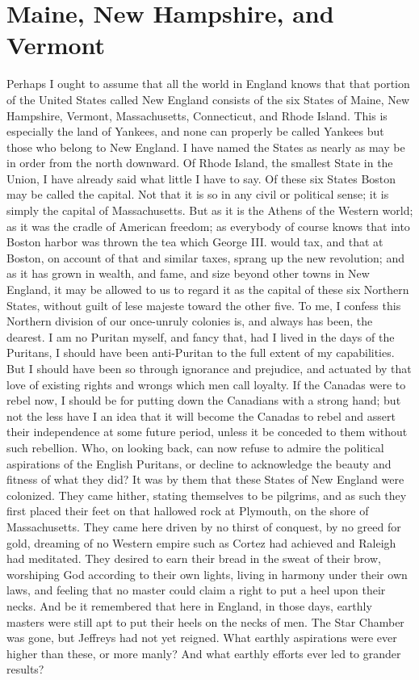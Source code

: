 \chapter{Maine, New Hampshire, and Vermont}


Perhaps I ought to assume that all the world in England knows that
that portion of the United States called New England consists of
the six States of Maine, New Hampshire, Vermont, Massachusetts,
Connecticut, and Rhode Island.  This is especially the land of
Yankees, and none can properly be called Yankees but those who
belong to New England.  I have named the States as nearly as may be
in order from the north downward.  Of Rhode Island, the smallest
State in the Union, I have already said what little I have to say.
Of these six States Boston may be called the capital.  Not that it
is so in any civil or political sense; it is simply the capital of
Massachusetts.  But as it is the Athens of the Western world; as it
was the cradle of American freedom; as everybody of course knows
that into Boston harbor was thrown the tea which George III. would
tax, and that at Boston, on account of that and similar taxes,
sprang up the new revolution; and as it has grown in wealth, and
fame, and size beyond other towns in New England, it may be allowed
to us to regard it as the capital of these six Northern States,
without guilt of lese majeste toward the other five.  To me, I
confess this Northern division of our once-unruly colonies is, and
always has been, the dearest.  I am no Puritan myself, and fancy
that, had I lived in the days of the Puritans, I should have been
anti-Puritan to the full extent of my capabilities.  But I should
have been so through ignorance and prejudice, and actuated by that
love of existing rights and wrongs which men call loyalty.  If the
Canadas were to rebel now, I should be for putting down the
Canadians with a strong hand; but not the less have I an idea that
it will become the Canadas to rebel and assert their independence
at some future period, unless it be conceded to them without such
rebellion.  Who, on looking back, can now refuse to admire the
political aspirations of the English Puritans, or decline to
acknowledge the beauty and fitness of what they did?  It was by
them that these States of New England were colonized.  They came
hither, stating themselves to be pilgrims, and as such they first
placed their feet on that hallowed rock at Plymouth, on the shore
of Massachusetts.  They came here driven by no thirst of conquest,
by no greed for gold, dreaming of no Western empire such as Cortez
had achieved and Raleigh had meditated.  They desired to earn their
bread in the sweat of their brow, worshiping God according to their
own lights, living in harmony under their own laws, and feeling
that no master could claim a right to put a heel upon their necks.
And be it remembered that here in England, in those days, earthly
masters were still apt to put their heels on the necks of men.  The
Star Chamber was gone, but Jeffreys had not yet reigned.  What
earthly aspirations were ever higher than these, or more manly?
And what earthly efforts ever led to grander results?

